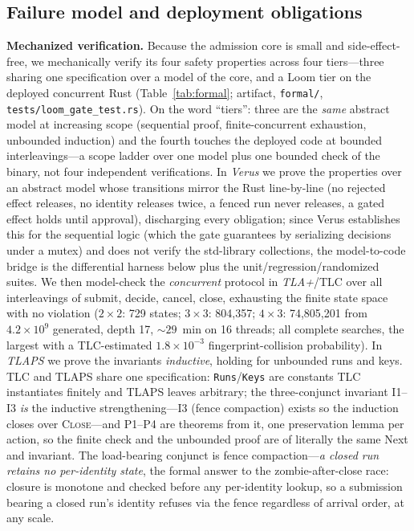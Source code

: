 \documentclass[10pt,journal,compsoc]{IEEEtran}
\begin{document}
\subsection{Failure model and deployment obligations}
\label{sec:failure-model}
\noindent\textbf{Mechanized verification.} Because the admission core is small
and side-effect-free, we mechanically verify its four safety properties across
four tiers---three sharing one specification over a model of the core, and a
Loom tier on the deployed concurrent Rust (Table~\ref{tab:formal}; artifact,
\texttt{formal/}, \texttt{tests/loom\_gate\_test.rs}). On the word ``tiers'':
three are the \emph{same} abstract model at increasing scope (sequential proof,
finite-concurrent exhaustion, unbounded induction) and the fourth touches the
deployed code at bounded interleavings---a scope ladder over one model plus one
bounded check of the binary, not four independent verifications. In \emph{Verus}
we prove the properties over an abstract model whose transitions mirror the Rust
line-by-line (no rejected effect releases, no identity releases twice, a fenced
run never releases, a gated effect holds until approval), discharging every
obligation; since Verus establishes this for the sequential logic (which the
gate guarantees by serializing decisions under a mutex) and does not verify the
std-library collections, the model-to-code bridge is the differential harness
below plus the unit/regression/randomized suites. We then model-check the
\emph{concurrent} protocol in \emph{TLA+}/TLC over all interleavings of submit,
decide, cancel, close, exhausting the finite state space with no violation
($2{\times}2$: 729 states; $3{\times}3$: 804{,}357; $4{\times}3$: 74{,}805{,}201
from $4.2{\times}10^{9}$ generated, depth 17, ${\sim}29$~min on 16 threads; all
complete searches, the largest with a TLC-estimated $1.8{\times}10^{-3}$
fingerprint-collision probability). In \emph{TLAPS} we prove the invariants
\emph{inductive}, holding for unbounded runs and keys. TLC and TLAPS share one
specification: \texttt{Runs}/\texttt{Keys} are constants TLC instantiates
finitely and TLAPS leaves arbitrary; the three-conjunct invariant I1--I3
\emph{is} the inductive strengthening---I3 (fence compaction) exists so the
induction closes over \textsc{Close}---and P1--P4 are theorems from it, one
preservation lemma per action, so the finite check and the unbounded proof are
of literally the same \textsf{Next} and invariant. The load-bearing conjunct is
fence compaction---\emph{a closed run retains no per-identity state}, the formal
answer to the zombie-after-close race: closure is monotone and checked before
any per-identity lookup, so a submission bearing a closed run's identity refuses
via the fence regardless of arrival order, at any scale.
\end{document}
